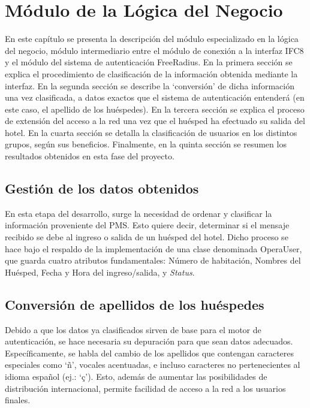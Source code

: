 \chapter{Módulo de la Lógica del Negocio}\label{chapter:Modulo de la Logica del Negocio}

		En este capítulo se presenta la descripción del módulo especializado en la lógica del negocio, módulo intermediario entre el módulo de conexión a la interfaz IFC8 y el módulo del sistema de autenticación FreeRadius. En la primera sección se explica el procedimiento de clasificación de la información obtenida mediante la interfaz. En la segunda sección se describe la ‘conversión’ de dicha información una vez clasificada, a datos exactos que el sistema de autenticación entenderá (en este caso, el apellido de los huéspedes). En la tercera sección se explica el proceso de extensión del acceso a la red una vez que el huésped ha efectuado su salida del hotel. En la cuarta sección se detalla la clasificación de usuarios en los distintos grupos, según sus beneficios. Finalmente, en la quinta sección se resumen los resultados obtenidos en esta fase del proyecto.

\section{Gestión de los datos obtenidos} \label{sect:Gestion de los datos obtenidos}
		En esta etapa del desarrollo, surge la necesidad de ordenar y clasificar la información proveniente del PMS. Esto quiere decir, determinar si el mensaje recibido se debe al ingreso o salida de un huésped del hotel. Dicho proceso se hace bajo el respaldo de la implementación de una clase denominada OperaUser, que guarda cuatro atributos fundamentales: Número de habitación, Nombres del Huésped, Fecha y Hora del ingreso/salida, y \textit{Status}.

\section{Conversión de apellidos de los huéspedes}

		Debido a que los datos ya clasificados sirven de base para el motor de autenticación, se hace necesaria su depuración para que sean datos adecuados. Específicamente, se habla del cambio de los apellidos que contengan caracteres especiales como ‘ñ’, vocales acentuadas, e incluso caracteres no pertenecientes al idioma español (ej.: ‘ç’). Esto, además de aumentar las posibilidades de distribución internacional, permite facilidad de acceso a la red a los usuarios finales. 
		
